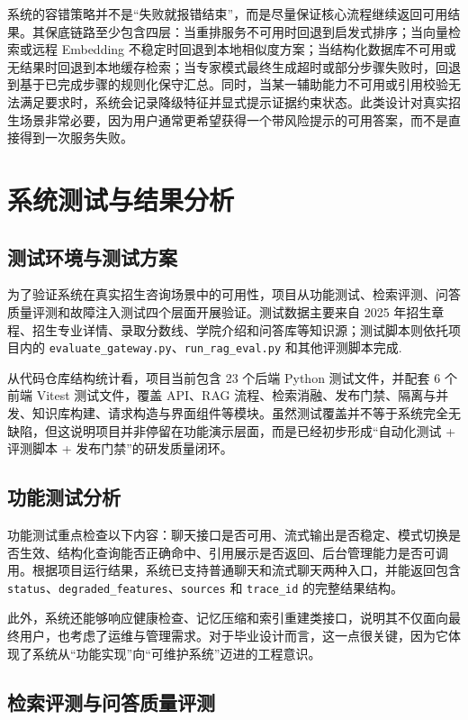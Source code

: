 \documentclass[UTF8,zihao=-4,oneside,fontset=windows]{ctexbook}
\numberwithin{equation}{chapter}
\begin{document}
系统的容错策略并不是“失败就报错结束”，而是尽量保证核心流程继续返回可用结果。其保底链路至少包含四层：当重排服务不可用时回退到启发式排序；当向量检索或远程 Embedding 不稳定时回退到本地相似度方案；当结构化数据库不可用或无结果时回退到本地缓存检索；当专家模式最终生成超时或部分步骤失败时，回退到基于已完成步骤的规则化保守汇总。同时，当某一辅助能力不可用或引用校验无法满足要求时，系统会记录降级特征并显式提示证据约束状态。此类设计对真实招生场景非常必要，因为用户通常更希望获得一个带风险提示的可用答案，而不是直接得到一次服务失败。

\chapter{系统测试与结果分析}

\section{测试环境与测试方案}
为了验证系统在真实招生咨询场景中的可用性，项目从功能测试、检索评测、问答质量评测和故障注入测试四个层面开展验证。测试数据主要来自 2025 年招生章程、招生专业详情、录取分数线、学院介绍和问答库等知识源；测试脚本则依托项目内的 \texttt{evaluate\_gateway.py}、\texttt{run\_rag\_eval.py} 和其他评测脚本完成\cite{projectreadme,ragevalreport,gateevalreport}.

从代码仓库结构统计看，项目当前包含 23 个后端 Python 测试文件，并配套 6 个前端 Vitest 测试文件，覆盖 API、RAG 流程、检索消融、发布门禁、隔离与并发、知识库构建、请求构造与界面组件等模块。虽然测试覆盖并不等于系统完全无缺陷，但这说明项目并非停留在功能演示层面，而是已经初步形成“自动化测试 + 评测脚本 + 发布门禁”的研发质量闭环。

\section{功能测试分析}
功能测试重点检查以下内容：聊天接口是否可用、流式输出是否稳定、模式切换是否生效、结构化查询能否正确命中、引用展示是否返回、后台管理能力是否可调用。根据项目运行结果，系统已支持普通聊天和流式聊天两种入口，并能返回包含 \texttt{status}、\texttt{degraded\_features}、\texttt{sources} 和 \texttt{trace\_id} 的完整结果结构\cite{projectreadme}。

此外，系统还能够响应健康检查、记忆压缩和索引重建类接口，说明其不仅面向最终用户，也考虑了运维与管理需求。对于毕业设计而言，这一点很关键，因为它体现了系统从“功能实现”向“可维护系统”迈进的工程意识。

\section{检索评测与问答质量评测}
\end{document}
